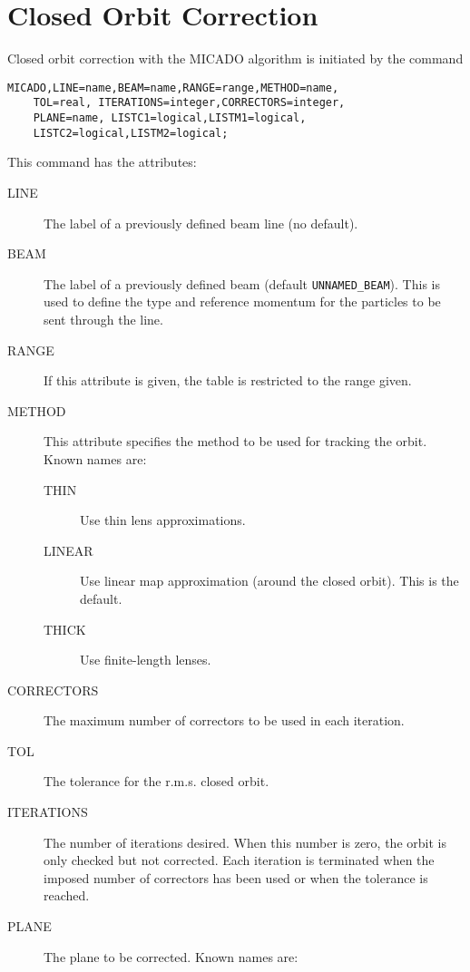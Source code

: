 \section{Closed Orbit Correction}
\label{sec:micado}
Closed orbit correction with the MICADO algorithm is initiated by the command 
\begin{verbatim}
MICADO,LINE=name,BEAM=name,RANGE=range,METHOD=name,
	TOL=real, ITERATIONS=integer,CORRECTORS=integer,
	PLANE=name, LISTC1=logical,LISTM1=logical,
	LISTC2=logical,LISTM2=logical;
\end{verbatim}
This command has the attributes:
\begin{description}
\item[LINE]
  The label of a previously defined beam line (no default).
\item[BEAM]
  The label of a previously defined beam (default \texttt{UNNAMED\_BEAM}).
  This is used to define the type and reference momentum for the
  particles to be sent through the line.
\item[RANGE]
  If this attribute is given, the table is restricted to the range given.
\item[METHOD]
  This attribute specifies the method to be used for tracking the orbit.
  Known names are:
  \begin{description}
  \item[THIN]
    Use thin lens approximations.
  \item[LINEAR]
    Use linear map approximation (around the closed orbit).
    This is the default.
  \item[THICK]
    Use finite-length lenses.
  \end{description}
\item[CORRECTORS]
  The maximum number of correctors to be used in each iteration.
\item[TOL]
  The tolerance for the r.m.s. closed orbit.
\item[ITERATIONS]
  The number of iterations desired.
  When this number is zero,
  the orbit is only checked but not corrected.
  Each iteration is terminated when the imposed number of correctors has been
  used or when the tolerance is reached.
\item[PLANE]
  The plane to be corrected.
  Known names are:
  \begin{description}

\end{description}
\end{description}
